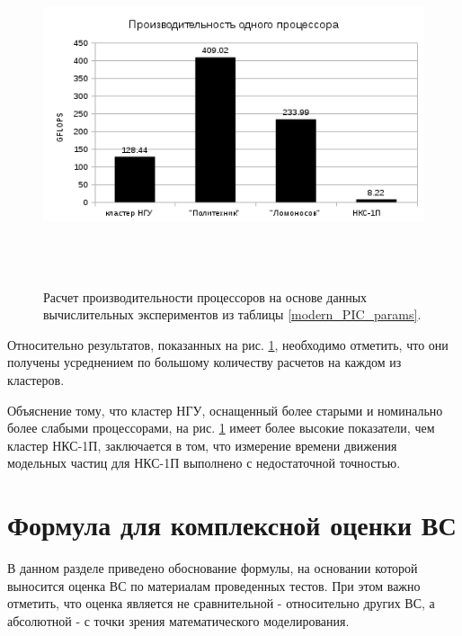 	
\begin{figure}[htb]
	\begin{center}
		\includegraphics[height=10cm,keepaspectratio]{images/modern_PIC_params_FLOPS_new.png}
	\end{center}
	\caption{Расчет производительности процессоров на основе данных вычислительных экспериментов из таблицы \ref{modern_PIC_params}. }
	\label{xi_flops}
\end{figure} 
Относительно результатов, показанных на рис. \ref{xi_flops}, необходимо отметить, что они получены усреднением по большому количеству расчетов на каждом из кластеров. 

Объяснение тому, что кластер НГУ, оснащенный более старыми и номинально более слабыми процессорами, на рис. \ref{xi_flops} имеет более высокие показатели, чем кластер НКС-1П, заключается в том, что измерение времени движения модельных частиц для НКС-1П выполнено с недостаточной точностью.

\clearpage








\section{Формула для комплексной оценки ВС}
\label{complex_evaluation}
В данном разделе приведено обоснование формулы, на основании которой выносится оценка ВС по материалам проведенных тестов. При этом важно отметить, что оценка является не сравнительной - относительно других ВС, а абсолютной - с точки зрения математического моделирования. 


